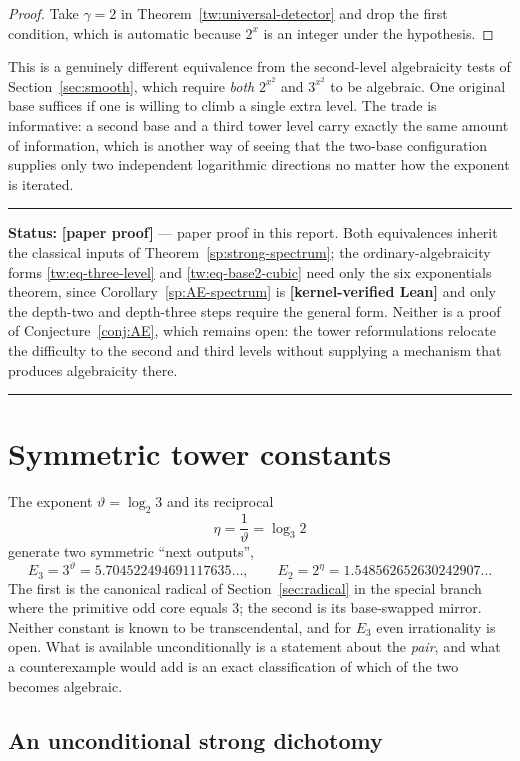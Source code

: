 \documentclass[11pt,oneside]{article}
\theoremstyle{definition}
\theoremstyle{remark}
\newcommand{\thetaq}{\vartheta}
\newcommand{\statuslean}{\textcolor{leanblue}{\textbf{[kernel-verified Lean]}}}
\newcommand{\statusnew}{\textcolor{newgreen}{\textbf{[paper proof]}}}
\newenvironment{statusbox}[1]
{\begin{center}\begin{minipage}{0.94\textwidth}\raggedright\hbadness=10000\hrule
\vspace{0.45em}\textbf{Status:} #1\par\vspace{0.35em}}
{\vspace{0.35em}\hrule\end{minipage}\end{center}}
\begin{document}
\begin{proof}
Take $\gamma=2$ in Theorem~\ref{tw:universal-detector} and drop the first condition, which is
automatic because $2^x$ is an integer under the hypothesis.
\end{proof}

This is a genuinely different equivalence from the second-level algebraicity tests of
Section~\ref{sec:smooth}, which require \emph{both} $2^{x^2}$ and $3^{x^2}$ to be algebraic.
One original base suffices if one is willing to climb a single extra level.  The trade is
informative: a second base and a third tower level carry exactly the same amount of
information, which is another way of seeing that the two-base configuration supplies only two
independent logarithmic directions no matter how the exponent is iterated.

\begin{statusbox}{\statusnew{} --- paper proof in this report.  Both equivalences inherit the
classical inputs of Theorem~\ref{sp:strong-spectrum}; the ordinary-algebraicity forms
\eqref{tw:eq-three-level} and \eqref{tw:eq-base2-cubic} need only the six exponentials
theorem, since Corollary~\ref{sp:AE-spectrum} is \statuslean{} and only the depth-two and
depth-three steps require the general form.  Neither is a proof of
Conjecture~\ref{conj:AE}, which remains open: the tower reformulations relocate the
difficulty to the second and third levels without supplying a mechanism that produces
algebraicity there.}
\end{statusbox}

\section{Symmetric tower constants}
\label{sec:symmetric}

The exponent $\thetaq=\log_2 3$ and its reciprocal
\[
 \eta=\frac1{\thetaq}=\log_3 2
\]
generate two symmetric ``next outputs'',
\[
 E_3=3^{\thetaq}=5.704522494691117635\ldots,
 \qquad
 E_2=2^{\eta}=1.548562652630242907\ldots
\]
The first is the canonical radical of Section~\ref{sec:radical} in the special branch where
the primitive odd core equals $3$; the second is its base-swapped mirror.  Neither constant
is known to be transcendental, and for $E_3$ even irrationality is open.  What is available
unconditionally is a statement about the \emph{pair}, and what a counterexample would add is
an exact classification of which of the two becomes algebraic.

\subsection{An unconditional strong dichotomy}
\end{document}
